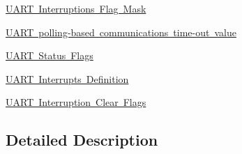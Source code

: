 \begin{DoxyCompactItemize}
\item 
\mbox{\hyperlink{group___u_a_r_t___interruption___mask}{U\+A\+R\+T Interruptions Flag Mask}}
\item 
\mbox{\hyperlink{group___u_a_r_t___time_out___value}{U\+A\+R\+T polling-\/based communications time-\/out value}}
\item 
\mbox{\hyperlink{group___u_a_r_t___flags}{U\+A\+R\+T Status Flags}}
\item 
\mbox{\hyperlink{group___u_a_r_t___interrupt__definition}{U\+A\+R\+T Interrupts Definition}}
\item 
\mbox{\hyperlink{group___u_a_r_t___i_t___c_l_e_a_r___flags}{U\+A\+R\+T Interruption Clear Flags}}
\end{DoxyCompactItemize}


\subsection{Detailed Description}
